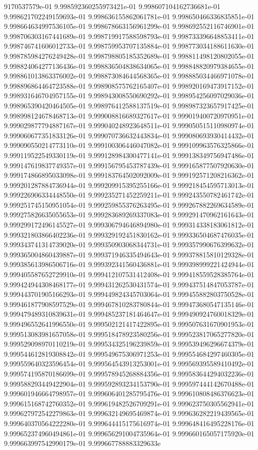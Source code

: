 9170537579e-01	9.998592360255973421e-01	9.998607104162736681e-01	9.998621702249159693e-01	9.998636155862061781e-01	9.998650466336835851e-01	9.998664634997536105e-01	9.998678663156961299e-01	9.998692552116746901e-01	9.998706303167441689e-01	9.998719917588598793e-01	9.998733396648853411e-01	9.998746741606012733e-01	9.998759953707135884e-01	9.998773034188611630e-01	9.998785984276249428e-01	9.998798805185352689e-01	9.998811498120802055e-01	9.998824064277136436e-01	9.998836504838634065e-01	9.998848820979384655e-01	9.998861013863376002e-01	9.998873084644568365e-01	9.998885034466971078e-01	9.998896864464723588e-01	9.998908575762165407e-01	9.998920169473917152e-01	9.998931646704957155e-01	9.998943008550690292e-01	9.998954256097029036e-01	9.998965390420464505e-01	9.998976412588137519e-01	9.998987323657917425e-01	9.998998124678468713e-01	9.999008816689327617e-01	9.999019400720970951e-01	9.999029877794887167e-01	9.999040248923648511e-01	9.999050515110980974e-01	9.999060677351833126e-01	9.999070736632443834e-01	9.999080693930414432e-01	9.999090550214773110e-01	9.999100306446047082e-01	9.999109963576325866e-01	9.999119522549330119e-01	9.999128984300477141e-01	9.999138349756947486e-01	9.999147619837749357e-01	9.999156795453787439e-01	9.999165877507920630e-01	9.999174866895033098e-01	9.999183764502092009e-01	9.999192571208216362e-01	9.999201287884736944e-01	9.999209915395255166e-01	9.999218454595713013e-01	9.999226906334448550e-01	9.999235271452259211e-01	9.999243550782461742e-01	9.999251745150951054e-01	9.999259855376263495e-01	9.999267882269634589e-01	9.999275826635055653e-01	9.999283689269337083e-01	9.999291470962161643e-01	9.999299172496145527e-01	9.999306794646894980e-01	9.999314338183061812e-01	9.999321803866402236e-01	9.999329192451830162e-01	9.999336504687476035e-01	9.999343741314739020e-01	9.999350903068344731e-01	9.999357990676399632e-01	9.999365004860439887e-01	9.999371946335494643e-01	9.999378815810129328e-01	9.999385613986506716e-01	9.999392341560436881e-01	9.999398999221424944e-01	9.999405587652729910e-01	9.999412107531412408e-01	9.999418559528385764e-01	9.999424944308468177e-01	9.999431262530431574e-01	9.999437514847053787e-01	9.999443701905166293e-01	9.999449824345703064e-01	9.999455882803750528e-01	9.999461877908597529e-01	9.999467810283780844e-01	9.999473680547135146e-01	9.999479489310839631e-01	9.999485237181464647e-01	9.999490924760018329e-01	9.999496552641996550e-01	9.999502121417422895e-01	9.999507631670901953e-01	9.999513083981657058e-01	9.999518478923580256e-01	9.999523817065277820e-01	9.999529098970110219e-01	9.999534325196239859e-01	9.999539496296674379e-01	9.999544612819308842e-01	9.999549675306971253e-01	9.999554684297460305e-01	9.999559640323596454e-01	9.999564543913253001e-01	9.999569395589410492e-01	9.999574195870186699e-01	9.999578945268884356e-01	9.999583644294032236e-01	9.999588293449422904e-01	9.999592893234153790e-01	9.999597444142670488e-01	9.999601946664798957e-01	9.999606401285795476e-01	9.999610808486376623e-01	9.999615168742760352e-01	9.999619482526709291e-01	9.999623750305562941e-01	9.999627972542279863e-01	9.999632149695469874e-01	9.999636282219439565e-01	9.999640370564222280e-01	9.999644415175616974e-01	9.999648416495228176e-01	9.999652374960494861e-01	9.999656291004735964e-01	9.999660165057175920e-01	9.999663997542990179e-01	9.999667788883329633e